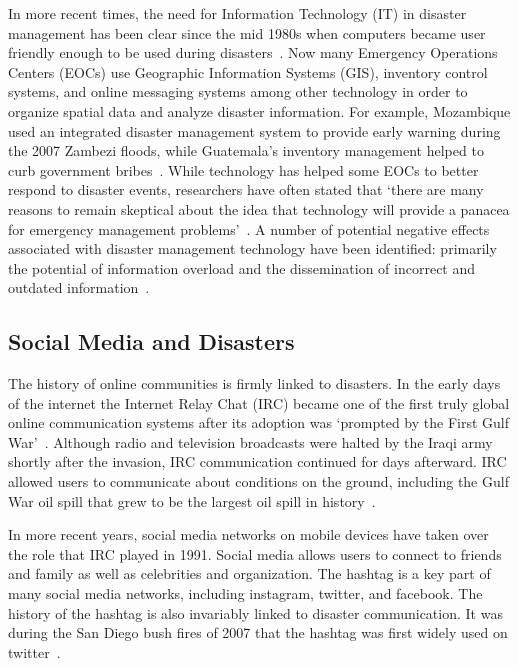 In more recent times, the need for Information Technology (IT) in disaster
management has been clear since the mid 1980s when computers became user
friendly enough to be used during
disasters~\cite{universityTerminalDisastersComputer1986}. Now many Emergency
Operations Centers (EOCs) use Geographic Information Systems (GIS), inventory
control systems, and online messaging systems among other technology in order to
organize spatial data and analyze disaster information.  For example, Mozambique
used an integrated disaster management system to provide
early warning during the 2007  Zambezi floods, while Guatemala's inventory
management helped to curb government bribes~\cite{aminDataNaturalDisasters2008}.
While technology has helped some EOCs to better respond to disaster events,
researchers have often stated that `there are many reasons to remain skeptical
about the idea that technology will provide a panacea for emergency management
problems'~\cite{tzemosUseGISFederal1995, tierneyFacingUnexpectedDisaster2001,
perryNaturalDisasterManagement2007}. A number of potential negative effects
associated with disaster management technology have been identified: primarily
the potential of information overload and the dissemination of incorrect and
outdated information~\cite{quarantelliProblematicalAspectsInformation1997,
flentgeDesigningContextAwareHCI}.

\subsection{Social Media and Disasters}\label{chap2:socialMedia}
The history of online communities is firmly linked to disasters. In the early
days of the internet the Internet Relay Chat (IRC) became one of the first truly
global online communication systems after its adoption was `prompted by the
First Gulf War'~\cite{salazarHashtagsAnnotatedHistory2017}. Although radio and
television broadcasts were halted by the Iraqi army shortly after the invasion,
IRC communication continued for days afterward. IRC allowed users to communicate
about conditions on the ground, including the Gulf War oil spill that grew to be
the largest oil spill in history~\cite{Timeline20Years2010}.

In more recent years, social media networks on mobile devices have taken over
the role that IRC played in 1991. Social media allows users to connect to
friends and family as well as celebrities and organization. The hashtag is a key
part of many social media networks, including instagram, twitter, and facebook.
The history of the hashtag is also invariably linked to disaster communication.
It was during the San Diego bush fires of 2007 that the hashtag was first widely
used on twitter~\cite{salazarHashtagsAnnotatedHistory2017}.

